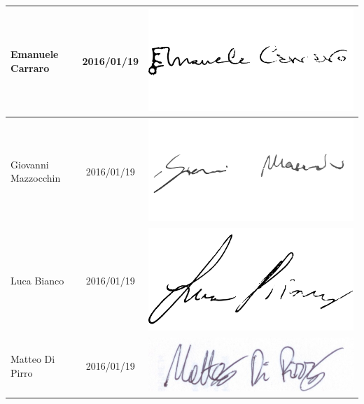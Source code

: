 \begin{center}
\begin{tabular}{ l | c | c }
    Emanuele Carraro & 2016/01/19 & \includegraphics[scale=0.1]{res/img/organigramma/EmanueleCarraro} \\ \hline
    Giovanni Mazzocchin & 2016/01/19 & \includegraphics[scale=0.1]{res/img/organigramma/GiovanniMazzocchin} \\ \hline
    Luca Bianco & 2016/01/19 & \includegraphics[scale=0.1]{res/img/organigramma/LucaBianco} \\ \hline
    Matteo Di Pirro & 2016/01/19 & \includegraphics[scale=0.8]{res/img/organigramma/MatteoDiPirro} \\
    \hline
  \end{tabular}
\end{center}


